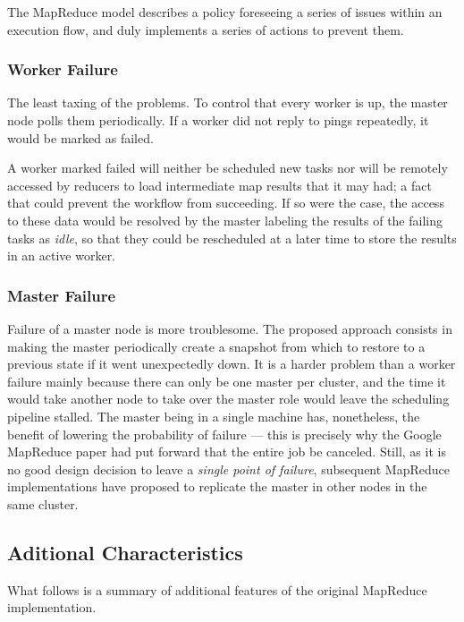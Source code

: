 The MapReduce model describes a policy foreseeing a series of issues within an execution flow, and duly implements a series of actions to prevent them.

\subsubsection{Worker Failure}\label{subsubsec:fallotrabajador}
\noindent The least taxing of the problems. To control that every worker is up, the master node polls them periodically. If a worker did not reply to pings repeatedly, it would be marked as failed.

A worker marked failed will neither be scheduled new tasks nor will be remotely accessed by reducers to load intermediate map results that it may had; a fact that could prevent the workflow from succeeding. If so were the case, the access to these data would be resolved by the master labeling the results of the failing tasks as \emph{idle}, so that they could be rescheduled at a later time to store the results in an active worker.

\subsubsection{Master Failure}\label{subsubsec:fallomaestro}
Failure of a master node is more troublesome. The proposed approach consists in making the master periodically create a snapshot from which to restore to a previous state if it went unexpectedly down. It is a harder problem than a worker failure mainly because there can only be one master per cluster, and the time it would take another node to take over the master role would leave the scheduling pipeline stalled. The master being in a single machine has, nonetheless, the benefit of lowering the probability of failure --- this is precisely why the Google MapReduce paper \cite{googlemapreduce} had put forward that the entire job be canceled. Still, as it is no good design decision to leave a \emph{single point of failure}, subsequent MapReduce implementations have proposed to replicate the master in other nodes in the same cluster.

\subsection{Aditional Characteristics}\label{subsec:caracteristicasadicionales}
\noindent What follows is a summary of additional features of the original MapReduce implementation.

